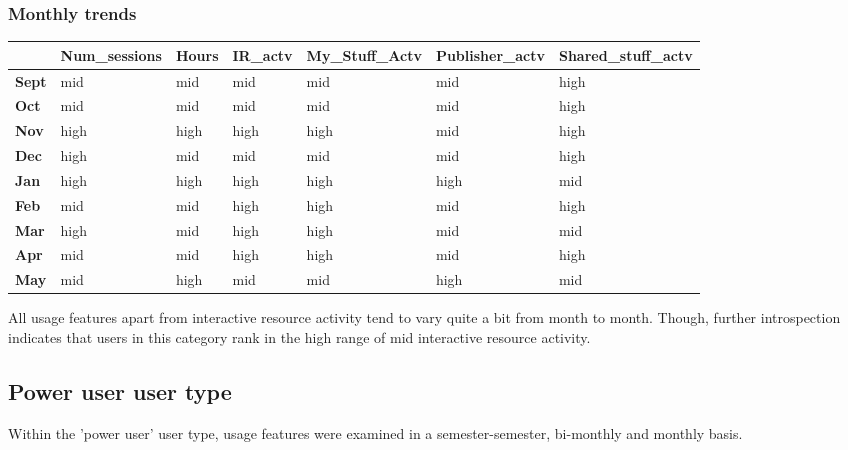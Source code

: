 \documentclass{acm_proc_article-sp}
\begin{document}
\subsubsection{Monthly trends}
\begin{table}
\begin{tabular}{|p{1cm}|p{1cm}|p{1cm}|p{1cm}|p{1cm}|p{1cm}|p{1cm}|}
 & Num\_sessions & Hours & IR\_actv & My\_Stuff\_Actv & Publisher\_actv & Shared\_stuff\_actv \\ \hline
\textbf{Sept} & mid                                    & mid   & mid         & mid             & mid            & high                \\
\textbf{Oct}   & mid                                    & mid   & mid         & mid             & mid            & high                \\
\textbf{Nov}  & high                                   & high  & high        & high            & mid            & high                \\
\textbf{Dec}  & high                                   & mid   & mid         & mid             & mid            & high                \\
\textbf{Jan}   & high                                   & high  & high        & high            & high           & mid                 \\
\textbf{Feb}  & mid                                    & mid   & high        & high            & mid            & high                \\
\textbf{Mar}     & high                                   & mid   & high        & high            & mid            & mid                 \\
\textbf{Apr}     & mid                                    & mid   & high        & high            & mid            & high                \\
\textbf{May}       & mid                                    & high  & mid         & mid             & high           & mid                
\end{tabular}
\end{table}
All usage features apart from interactive resource activity tend to vary quite a bit from month to month. Though, further introspection indicates that users in this category rank in the high range of mid interactive resource activity.

\subsection {Power user user type}
Within the 'power user' user type, usage features were examined in a semester-semester, bi-monthly and monthly basis.
\end{document}
